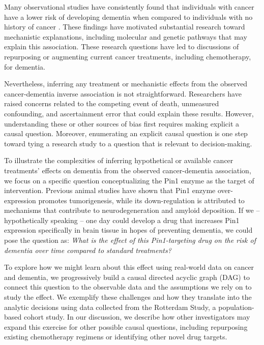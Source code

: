 \documentclass[
]{book}
\begin{document}
Many observational studies have consistently found that individuals with cancer have a lower risk of developing dementia when compared to individuals with no history of cancer \autocite{ma2014,hanson2016,vanderwillik2018,ospina2020}. These findings have motivated substantial research toward mechanistic explanations, including molecular and genetic pathways that may explain this association\autocite{behrens2009,harris2014,nudelman2019,Papin2020,driverbiogeront2014,olson2019,li2021,driverpin2015}. These research questions have led to discussions of repurposing or augmenting current cancer treatments, including chemotherapy, for dementia\autocite{snyder2017}.

Nevertheless, inferring any treatment or mechanistic effects from the observed cancer-dementia inverse association is not straightforward. Researchers have raised concerns related to the competing event of death, unmeasured confounding, and ascertainment error that could explain these results\autocite{driverbiogeront2014,ganguli2015}. However, understanding these or other sources of bias first requires making explicit a causal question. Moreover, enumerating an explicit causal question is one step toward tying a research study to a question that is relevant to decision-making\autocite{didelez2016,labrecque2017}.

To illustrate the complexities of inferring hypothetical or available cancer treatments' effects on dementia from the observed cancer-dementia association, we focus on a specific question conceptualizing the Pin1 enzyme as the target of intervention. Previous animal studies have shown that Pin1 enzyme over-expression promotes tumorigenesis, while its down-regulation is attributed to mechanisms that contribute to neurodegeneration and amyloid deposition\autocite{driverpin2015,angelucci2017,li2021}. If we -- hypothetically speaking -- one day could develop a drug that increases Pin1 expression specifically in brain tissue in hopes of preventing dementia, we could pose the question as: \emph{What is the effect of this Pin1-targeting drug on the risk of dementia over time compared to standard treatments?}

To explore how we might learn about this effect using real-world data on cancer and dementia, we progressively build a causal directed acyclic graph (DAG) to connect this question to the observable data and the assumptions we rely on to study the effect. We exemplify these challenges and how they translate into the analytic decisions using data collected from the Rotterdam Study, a population-based cohort study. In our discussion, we describe how other investigators may expand this exercise for other possible causal questions, including repurposing existing chemotherapy regimens or identifying other novel drug targets.
\end{document}
